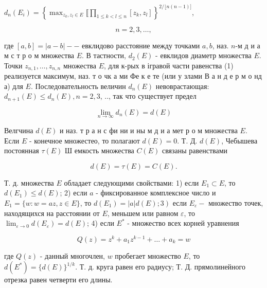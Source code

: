 \documentclass[10pt]{article}
\begin{document}
$d_{n}\left(E_{i}\right)=\left\{\max _{z_{k}, z_{l} \in E} \llbracket \prod_{1 \leqslant k<l \leqslant n}\left[z_{k}, z_{l}\right]\right\}^{2 /\lfloor n(n-1)]}$,



\[

n=2,3, \ldots,

\]



где $[a, b]=|a-b|--$ евклидово расстояние между точками $a, b$, наз. $n$-м д и а м с т р о м множества $E$. В тастности, $d_{2}(E)$ - евклидов диаметр множества $E$. Точки $z_{n, 1}, \ldots, z_{n, n}$ множества $E$, для к-рых в ігравой части равенства (1) реализуется максимум, наз. т о чк а ми Фе к е те (или у злами В а н д е р м о нд а) для $E$. Последовательность величин $d_{n}(E)$ невоврастающая: $d_{n+1}(E) \leqslant d_{n}(E), n=2,3$, .., так что существует предел



\[

\lim _{n \rightarrow \infty} d_{n}(E)=d(E)

\]



Велгчина $d(E)$ и наз. т р а н с фи ни и ны м д и а мет р о м множества $E$. Если $E$ - конечное множестео, то полагают $d(E)=0$. Т. Д. $d(E)$, Чебышева постоянная $\tau(E)$ Ш емкость множества $C(E)$ связаны равенствами



\[

d(E)=\tau(E)=C(E) .

\]



Т. д. множества $E$ обладает следующими свойствами: 1) если $E_{1} \subset E$, то $d\left(E_{1}\right) \leqslant d(E)$; 2) если $a$ - фиксированное комплексное число и $E_{1}=\{w: w=a z, z \in E\}$, то $\left.d\left(E_{1}\right)=|a| d(E) ; 3\right)$ если $E_{\varepsilon}-$ множество точек, находящихся на расстоянии от $E$, меньшем или равном $\varepsilon$, то $\lim _{\varepsilon \rightarrow 0} d\left(E_{\varepsilon}\right)=d(E)$; 4) если $E^{*}$ - множество всех корней уравнения



\[

Q(z)=z^{k}+a_{1} z^{k-1}+\ldots+a_{k}=w

\]



где $Q(z)$ - данный многочлен, $w$ пробегает множество $E$, то $d\left(E^{*}\right)=\{d(E)\}^{1 / k}$. Т. д. круга равен его радиусу; Т. Д. прямолинейного отрезка равен четверти его длины.
\end{document}
